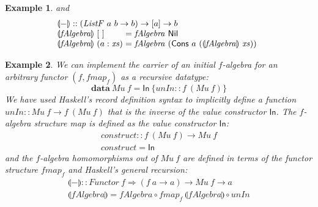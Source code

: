 \documentclass{jfp1}
\newcommand{\fold}[1]{\llparenthesis #1 \rrparenthesis}
\newtheorem{example}{Example}
\newcommand{\kw}[1]{\textbf{#1}}
\begin{document}
\begin{example}
  and
  \begin{displaymath}
    \begin{array}{l}
      \fold{-} :: (\mathit{ListF}~a~b \to b) \to [a] \to b \\
      \begin{array}{@{}l@{\hspace{0.3em}}l@{\hspace{0.3em}}c@{\hspace{0.3em}}l}
        \fold{\mathit{fAlgebra}}&[~]&=&\mathit{fAlgebra}~\mathsf{Nil} \\
        \fold{\mathit{fAlgebra}}&(a : \mathit{xs})&=&\mathit{fAlgebra}~(\mathsf{Cons}~a~(\fold{\mathit{fAlgebra}}~\mathit{xs}))
      \end{array}
    \end{array}
  \end{displaymath}
\end{example}

\begin{example}
  We can implement the carrier of an initial $f$-algebra for an arbitrary
  functor $(f, \mathit{fmap}_f)$ as a recursive datatype:
  \begin{displaymath}
    \kw{data}~\mathit{Mu}~f = \mathsf{In}~\{ \mathit{unIn} :: f~(\mathit{Mu}~f) \}
  \end{displaymath}
  We have used Haskell's record definition syntax to implicitly define
  a function $\mathit{unIn} :: \mathit{Mu}~f \to f~(\mathit{Mu}~f)$
  that is the inverse of the value constructor $\mathsf{In}$.  The
  $f$-algebra structure map is defined as the value
  constructor $\mathsf{In}$:
  \begin{displaymath}
    \begin{array}{l}
      \mathit{construct} :: f~(\mathit{Mu}~f) \to \mathit{Mu}~f \\
      \mathit{construct} = \mathsf{In}
    \end{array}
  \end{displaymath}
  and the $f$-algebra homomorphisms out of $\mathit{Mu}~f$ are defined
  in terms of the functor structure $\mathit{fmap}_f$ and Haskell's
  general recursion:
  \begin{displaymath}
    \begin{array}{l}
      \fold{-} :: \mathit{Functor}~f \Rightarrow (f~a \to a) \to \mathit{Mu}~f \to a \\
      \fold{\mathit{fAlgebra}} = \mathit{fAlgebra} \circ \mathit{fmap}_f~\fold{\mathit{fAlgebra}} \circ \mathit{unIn}
    \end{array}
  \end{displaymath}
\end{example}
\end{document}

